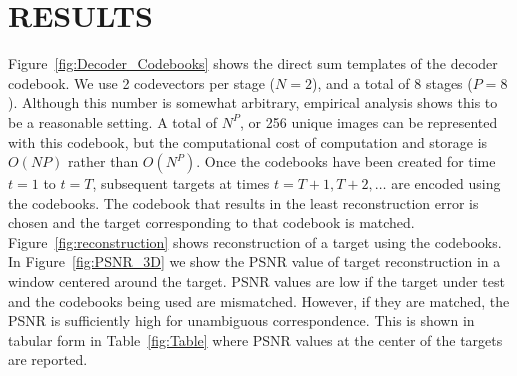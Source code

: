 \documentclass{article}
\begin{document}
\section{RESULTS}
Figure~\ref{fig:Decoder_Codebooks} shows the direct sum templates of the decoder codebook.  We use 2 codevectors per stage ($N=2$), and a total of 8 stages ($P=8$).  Although this number is somewhat arbitrary, empirical analysis shows this to be a reasonable setting.  A total of $N^P$, or 256 unique images can be represented with this codebook, but the computational cost of computation and storage is $O(NP)$ rather than $O(N^P)$.  Once the codebooks have been created for time $t=1$ to $t=T$, subsequent targets at times $t=T+1, T+2, \ldots$ are encoded using the codebooks.  The codebook that results in the least reconstruction error is chosen and the target corresponding to that codebook is matched.  Figure~\ref{fig:reconstruction} shows reconstruction of a target using the codebooks.  In Figure~\ref{fig:PSNR_3D} we show the PSNR value of target reconstruction in a window centered around the target.  PSNR values are low if the target under test and the codebooks being used are mismatched.  However, if they are matched, the PSNR is sufficiently high for unambiguous correspondence.  This is shown in tabular form in Table~\ref{fig:Table} where PSNR values at the center of the targets are reported. 
\end{document}
